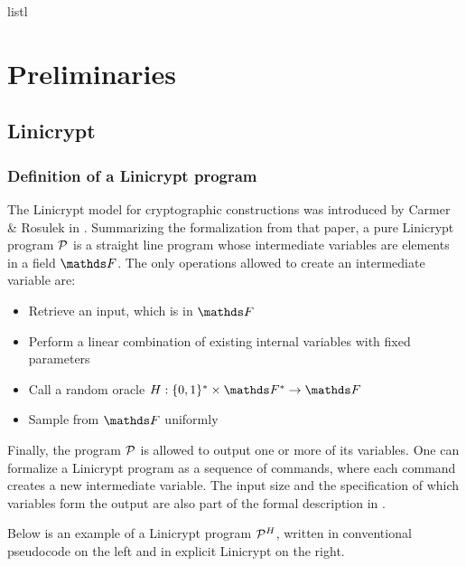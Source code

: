 listl\chapter{Preliminaries}

\section{Linicrypt}
\subsection{Definition of a Linicrypt program}

The Linicrypt model for cryptographic constructions was introduced by Carmer \& Rosulek in \cite{C:CarRos16}.
Summarizing the formalization from that paper,
a pure Linicrypt program $\P$ is a straight line program
whose intermediate variables are elements in a field $\F$.
The only operations allowed to create an intermediate variable are:
\begin{itemize}
  \item Retrieve an input, which is in $\F$
  \item Perform a linear combination of existing internal variables with fixed parameters
  \item Call a random oracle $\H: \{0,1\}^* \times \F^* \to \F$
  \item Sample from $\F$ uniformly
\end{itemize}
Finally, the program $\P$ is allowed to output one or more of its variables.
One can formalize a Linicrypt program as a sequence of commands,
where each command creates a new intermediate variable.
The input size and the specification of which variables form the output are also part of the formal description in \cite{C:CarRos16}.

Below is an example of a Linicrypt program $\P^\H$,
written in conventional pseudocode on the left and in explicit Linicrypt on the right. 

\begin{pchstack}[center, space=0.4cm]
  \pseudocode[valign=c]{\rightsquigarrow}
\end{pchstack}

